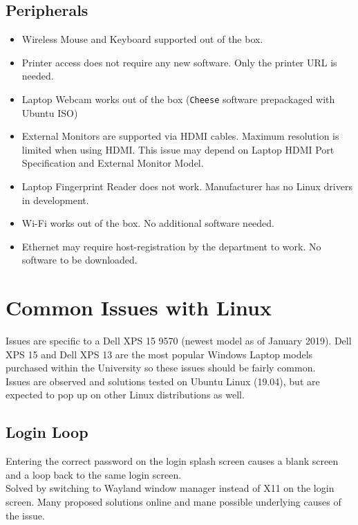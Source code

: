 \documentclass[8pt,letterpaper,twocolumn]{article}
\begin{document}
\subsection{Peripherals}

\begin{itemize}
	\item Wireless Mouse and Keyboard supported out of the box.
	\item Printer access does not require any new software. Only the printer URL is needed.
	\item Laptop Webcam works out of the box (\texttt{Cheese} software prepackaged with Ubuntu ISO)
	\item External Monitors are supported via HDMI cables. Maximum resolution is limited when using HDMI. This issue may depend on Laptop HDMI Port Specification and External Monitor Model.
	\item Laptop Fingerprint Reader does not work. Manufacturer has no Linux drivers in development.
	\item Wi-Fi works out of the box. No additional software needed.
	\item Ethernet may require host-registration by the department to work. No software to be downloaded.
\end{itemize}

\newpage

\section{Common Issues with Linux}

Issues are specific to a Dell XPS 15 9570 (newest model as of January 2019). Dell XPS 15 and Dell XPS 13 are the most popular Windows Laptop models purchased within the University so these issues should be fairly common. \\

Issues are observed and solutions tested on Ubuntu Linux (19.04), but are expected to pop up on other Linux distributions as well.

\subsection{Login Loop}

Entering the correct password on the login splash screen causes a blank screen and a loop back to the same login screen.\\

Solved by switching to Wayland window manager instead of X11 on the login screen. Many proposed solutions online and mane possible underlying causes of the issue. 
\end{document}
